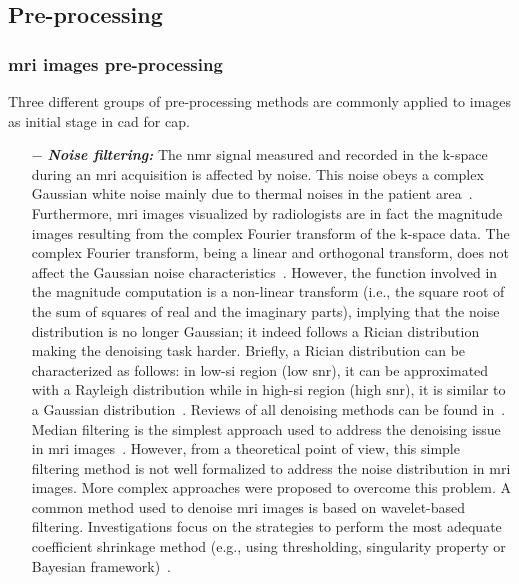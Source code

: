 \subsection{Pre-processing} \label{subsec:preprocessing}

\subsubsection{\ac{mri} images pre-processing}

Three different groups of pre-processing methods are commonly applied to images as initial stage in \ac{cad} for \ac{cap}.

\begin{enumerate}[leftmargin=*]

\item[$-$] \textbf{\textit{Noise filtering:}} The \ac{nmr} signal measured and recorded in the k-space during an \ac{mri} acquisition is affected by noise. This noise obeys a complex Gaussian white noise mainly due to thermal noises in the patient area~\cite{Nowak1999}. Furthermore, \ac{mri} images visualized by radiologists are in fact the magnitude images resulting from the complex Fourier transform of the k-space data. The complex Fourier transform, being a linear and orthogonal transform, does not affect the Gaussian noise characteristics~\cite{Nowak1999}. However, the function involved in the magnitude computation is a non-linear transform (i.e., the square root of the sum of squares of real and the imaginary parts), implying that the noise distribution is no longer Gaussian; it indeed follows a Rician distribution making the denoising task harder. Briefly, a Rician distribution can be characterized as follows: in low-\ac{si} region (low \ac{snr}), it can be approximated with a Rayleigh distribution while in high-\ac{si} region (high \ac{snr}), it is similar to a Gaussian distribution~\cite{Manjon2008}. Reviews of all denoising methods can be found in~\cite{Buades2005,Mohan2014}.
Median filtering is the simplest approach used to address the denoising issue in \ac{mri} images~\cite{Ozer2009,Ozer2010}. However, from a theoretical point of view, this simple filtering method is not well formalized to address the noise distribution in \ac{mri} images.
More complex approaches were proposed to overcome this problem. A common method used to denoise \ac{mri} images is based on wavelet-based filtering. Investigations focus on the strategies to perform the most adequate coefficient shrinkage method (e.g., using thresholding, singularity property or Bayesian framework)~\cite{Pizurica2002}.

\end{enumerate}
